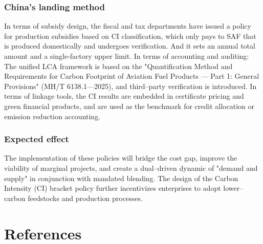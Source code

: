 \documentclass[a4paper,11pt]{article}
\begin{document}
\subsubsection{China's landing method}
In terms of subsidy design, the fiscal and tax departments have issued a policy for production subsidies based on CI classification, which only pays to SAF that is produced domestically and undergoes verification. And it sets an annual total amount and a single-factory upper limit. In terms of accounting and auditing: The unified LCA framework is based on the "Quantification Method and Requirements for Carbon Footprint of Aviation Fuel Products --- Part 1: General Provisions" (MH/T 6138.1—2025), and third--party verification is introduced. In terms of linkage tools, the CI results are embedded in certificate pricing and green financial products, and are used as the benchmark for credit allocation or emission reduction accounting.

\subsubsection{Expected effect}
The implementation of these policies will bridge the cost gap, improve the viability of marginal projects, and create a dual--driven dynamic of "demand and supply" in conjunction with mandated blending. The design of the Carbon Intensity (CI) bracket policy further incentivizes enterprises to adopt lower--carbon feedstocks and production processes.








\section{References}
\end{document}
